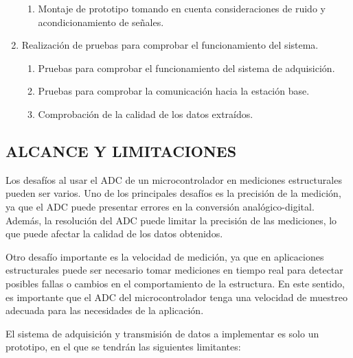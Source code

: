 \documentclass[12pt,letterpaper]{article}
\begin{document}
\begin{enumerate}[1.]
\begin{enumerate}
		\item Montaje de prototipo tomando en cuenta consideraciones de ruido y acondicionamiento de señales.
		
	\end{enumerate}

	\item Realización de pruebas para comprobar el funcionamiento del sistema.
	
	
	\begin{enumerate}
		
		\item Pruebas para comprobar el funcionamiento del sistema de adquisición.
		
		\item Pruebas para comprobar la comunicación hacia la estación base.
		\item Comprobación de la calidad de los datos extraídos.
		
	\end{enumerate}
	
	
	
	
	
\end{enumerate}


	
	
\newpage
	
	
		\begin{center}
		
		\section*{ ALCANCE Y LIMITACIONES}	
	\end{center}

	Los desafíos al usar el ADC de un microcontrolador en mediciones estructurales pueden ser varios. Uno de los principales desafíos es la precisión de la medición, ya que el ADC puede presentar errores en la conversión analógico-digital. Además, la resolución del ADC puede limitar la precisión de las mediciones, lo que puede afectar la calidad de los datos obtenidos.

	Otro desafío importante es la velocidad de medición, ya que en aplicaciones estructurales puede ser necesario tomar mediciones en tiempo real para detectar posibles fallas o cambios en el comportamiento de la estructura. En este sentido, es importante que el ADC del microcontrolador tenga una velocidad de muestreo adecuada para las necesidades de la aplicación.
	
	El sistema de adquisición y transmisión de datos a implementar es solo un prototipo, en el que se tendrán las siguientes limitantes:
		
\end{document}
